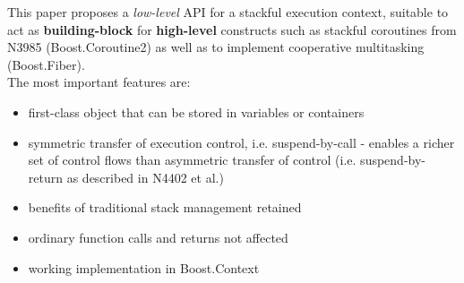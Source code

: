 This paper proposes a \emph{low-level} API for a stackful execution context,
suitable to act as {\bfseries building-block} for {\bfseries high-level}
constructs such as stackful coroutines from N3985\cite{N3985}
(Boost.Coroutine2\cite{bcoroutine2}) as well as to implement
cooperative multitasking (Boost.Fiber\cite{bfiber}).\\
\newline
The most important features are:
\begin{itemize}
    \item first-class object that can be stored in variables or containers
    \item symmetric transfer of execution control, i.e. suspend-by-call -
          enables a richer set of control flows than asymmetric transfer of
          control (i.e. suspend-by-return as described in N4402\cite{N4402} et al.)
    \item benefits of traditional stack management retained
    \item ordinary function calls and returns not affected
    \item working implementation in Boost.Context\cite{bcontext}
\end{itemize}

